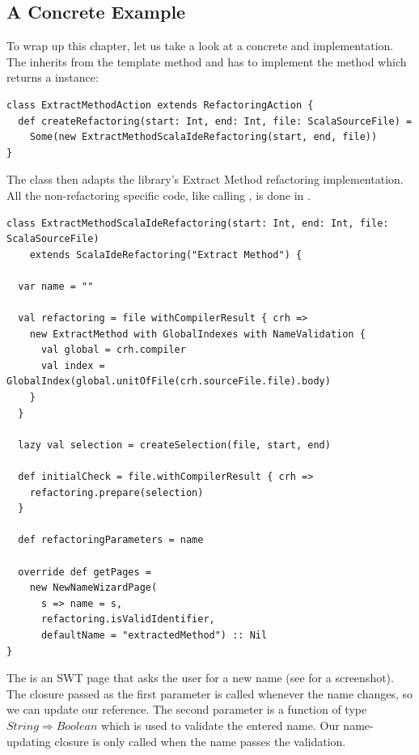 \documentclass[10pt,a4paper,oneside]{scrreprt}
\begin{document}
\subsection{A Concrete Example}

To wrap up this chapter, let us take a look at a  concrete  and  implementation. The  inherits from the  template method and has to implement the  method which returns a  instance:

\begin{lstlisting}
class ExtractMethodAction extends RefactoringAction {
  def createRefactoring(start: Int, end: Int, file: ScalaSourceFile) = 
    Some(new ExtractMethodScalaIdeRefactoring(start, end, file))
}
\end{lstlisting}

The  class then adapts the library's Extract Method refactoring implementation. All the non-refactoring specific code, like calling , is done in .

\newpage
\begin{lstlisting}
class ExtractMethodScalaIdeRefactoring(start: Int, end: Int, file: ScalaSourceFile) 
    extends ScalaIdeRefactoring("Extract Method") {
  
  var name = ""
  
  val refactoring = file withCompilerResult { crh => 
    new ExtractMethod with GlobalIndexes with NameValidation {
      val global = crh.compiler
      val index = GlobalIndex(global.unitOfFile(crh.sourceFile.file).body)
    }
  }

  lazy val selection = createSelection(file, start, end)

  def initialCheck = file.withCompilerResult { crh =>
    refactoring.prepare(selection)
  }
  
  def refactoringParameters = name
  
  override def getPages = 
    new NewNameWizardPage(
      s => name = s, 
      refactoring.isValidIdentifier, 
      defaultName = "extractedMethod") :: Nil 
}
\end{lstlisting}

The  is an SWT page that asks the user for a new name (see  for a screenshot). The closure passed as the first parameter is called whenever the name changes, so we can update our reference. The second parameter is a function of type $String \Rightarrow Boolean$ which is used to validate the entered name. Our name-updating closure is only called when the name passes the validation.
\end{document}
